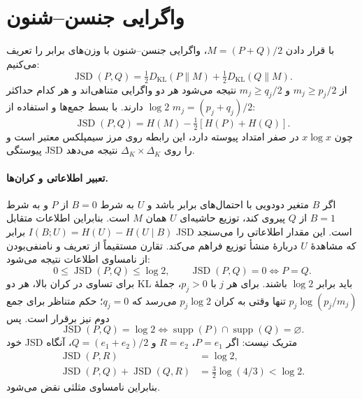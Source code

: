 \section{واگرایی جنسن--شنون}
با قرار دادن $M=(P+Q)/2$، واگرایی جنسن--شنون با وزن‌های برابر \cite{Lin1991JensenShannon} را تعریف می‌کنیم:
\begin{equation}\label{cmp:eq:ch3-JSD-definition}
\operatorname{JSD}(P,Q)=\tfrac12D_{\mathrm{KL}}(P\|M)+\tfrac12D_{\mathrm{KL}}(Q\|M).
\end{equation}
از $m_j\ge p_j/2$ و $m_j\ge q_j/2$ نتیجه می‌شود هر دو واگرایی متناهی‌اند و هر کدام حداکثر $\log2$ دارند. با بسط جمع‌ها و استفاده از $m_j=(p_j+q_j)/2$:
\begin{equation}\label{cmp:eq:ch3-JSD-entropy}
\operatorname{JSD}(P,Q)=H(M)-\tfrac12[H(P)+H(Q)].
\end{equation}
چون $x\log x$ در صفر امتداد پیوسته دارد، این رابطه روی مرز سیمپلکس معتبر است و پیوستگی JSD را روی $\Delta_K\times\Delta_K$ نتیجه می‌دهد.

\paragraph{تعبیر اطلاعاتی و کران‌ها.}
اگر $B$ متغیر دودویی با احتمال‌های برابر باشد و $U$ به شرط $B=0$ از $P$ و به شرط $B=1$ از $Q$ پیروی کند، توزیع حاشیه‌ای $U$ همان $M$ است. بنابراین اطلاعات متقابل $I(B;U)=H(U)-H(U\mid B)$ برابر JSD است. این مقدار اطلاعاتی را می‌سنجد که مشاهدهٔ $U$ دربارهٔ منشأ توزیع فراهم می‌کند.
تقارن مستقیماً از تعریف و نامنفی‌بودن از نامساوی اطلاعات نتیجه می‌شود:
\begin{equation}\label{eq:app-pd-js-range-zero}
0\le\operatorname{JSD}(P,Q)\le\log2,\qquad
\operatorname{JSD}(P,Q)=0\Longleftrightarrow P=Q.
\end{equation}
برای تساوی در کران بالا، هر دو KL باید برابر $\log2$ باشند. برای هر $j$ با $p_j>0$، جملهٔ $p_j\log(p_j/m_j)$ تنها وقتی به کران $p_j\log2$ می‌رسد که $q_j=0$؛ حکم متناظر برای جمع دوم نیز برقرار است. پس
\begin{equation}\label{eq:app-pd-js-max}
\operatorname{JSD}(P,Q)=\log2\Longleftrightarrow
\operatorname{supp}(P)\cap\operatorname{supp}(Q)=\varnothing.
\end{equation}
خود JSD متریک نیست: اگر $P=e_1$، $R=e_2$ و $Q=(e_1+e_2)/2$، آنگاه
\begin{equation}\label{eq:app-pd-js-not-metric}
\begin{aligned}
\operatorname{JSD}(P,R)&=\log2,\\
\operatorname{JSD}(P,Q)+\operatorname{JSD}(Q,R)
&=\tfrac32\log(4/3)<\log2.
\end{aligned}
\end{equation}
بنابراین نامساوی مثلثی نقض می‌شود.

